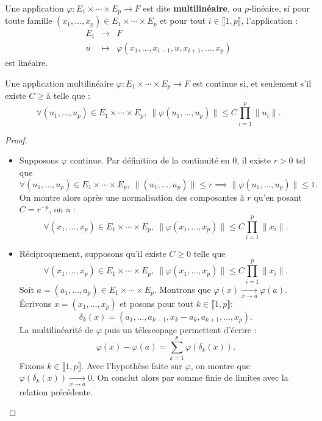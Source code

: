\documentclass[french]{article}
\theoremstyle{plain}
\theoremstyle{definition}
\theoremstyle{remark}
\begin{document}
\begin{dfn}
	Une application $\varphi:E_1\times\cdots\times E_p\to F$ est dite \textbf{multilinéaire}, ou $p$-linéaire, si pour toute famille $(x_1,\ldots,x_p)\in E_1\times\cdots\times E_p$ et pour tout $i\in\llbracket1,p\rrbracket$, l'application : $$\begin{array}{rcl}
		E_i&\longrightarrow&F\\
		u&\longmapsto&\varphi(x_1,\ldots,x_{i-1},u,x_{i+1},\ldots,x_p)
	\end{array}$$ est linéaire.
\end{dfn}

\begin{prop}%
	Une application multilinéaire $\varphi:E_1\times\cdots\times E_p\to F$ est continue si, et seulement s'il existe $C\geqslant à$ telle que : $$\forall (u_1,\ldots,u_p)\in E_1\times\cdots\times E_p,\ \lVert \varphi(u_1,\ldots,u_p)\rVert\leqslant C\prod_{i=1}^{p}\lVert u_i\rVert.$$
\end{prop}
\begin{proof}
	\begin{itemize}
		\item Supposons $\varphi$ continue. Par définition de la continuité en $0$, il existe $r>0$ tel que $$\forall (u_1,\ldots,u_p)\in E_1\times\cdots\times E_p,\ \lVert (u_1,\ldots,u_p)\rVert\leqslant r\implies\lVert\varphi(u_1,\ldots,u_p)\rVert\leqslant1.$$ On montre alors après une normalisation des composantes à $r$ qu'en posant $C=r^{-p}$, on a : $$\forall (x_1,\ldots,x_p)\in E_1\times\cdots\times E_p,\ \lVert \varphi(x_1,\ldots,x_p)\rVert\leqslant C\prod_{i=1}^{p}\lVert x_i\rVert.$$
		\item Réciproquement, supposons qu'il existe $C\geqslant 0$ telle que
		$$\forall (x_1,\ldots,x_p)\in E_1\times\cdots\times E_p,\ \lVert \varphi(x_1,\ldots,x_p)\rVert\leqslant C\prod_{i=1}^{p}\lVert x_i\rVert.$$ Soit $a=(a_1,\ldots,a_p)\in E_1\times\cdots\times E_p$. Montrons que $\varphi(x)\xrightarrow[x\to a]{}\varphi(a)$. Écrivons $x=(x_1,\ldots,x_p)$ et posons pour tout $k\in\llbracket 1,p\rrbracket$: $$\delta_k(x)=(a_1,\ldots,a_{k-1},x_k-a_k,a_{k+1},\ldots,x_p).$$ La multilinéarité de $\varphi$ puis un télescopage permettent d'écrire : $$\varphi(x)-\varphi(a)=\sum_{k=1}^{p}\varphi(\delta_k(x)).$$ Fixons $k\in\llbracket1,p\rrbracket$. Avec l'hypothèse faite sur $\varphi$, on montre que $\varphi(\delta_k(x))\xrightarrow[x\to a]{}0$. On conclut alors par somme finie de limites avec la relation précédente.
	\end{itemize}
\end{proof}
\end{document}
